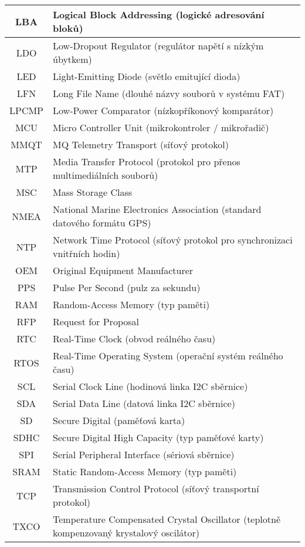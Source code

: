 \begin{longtable}{|c|p{12cm}|}
LBA     & Logical Block Addressing (logické adresování bloků) \\ \hline
LDO     & Low-Dropout Regulator (regulátor napětí s nízkým úbytkem) \\ \hline
LED     & Light-Emitting Diode (světlo emitující dioda) \\ \hline
LFN     & Long File Name (dlouhé názvy souborů v systému FAT) \\ \hline
LPCMP   & Low-Power Comparator (nízkopříkonový komparátor) \\ \hline
MCU     & Micro Controller Unit (mikrokontroler / mikrořadič) \\ \hline
MMQT    & MQ Telemetry Transport (síťový protokol) \\ \hline
MTP     & Media Transfer Protocol (protokol pro přenos multimediálních souborů) \\ \hline
MSC     & Mass Storage Class \\ \hline
NMEA    & National Marine Electronics Association (standard datového formátu GPS) \\ \hline
NTP     & Network Time Protocol (síťový protokol pro synchronizaci vnitřních hodin) \\ \hline
OEM     & Original Equipment Manufacturer \\ \hline
PPS     & Pulse Per Second (pulz za sekundu) \\ \hline
RAM     & Random-Access Memory (typ paměti) \\ \hline
RFP     & Request for Proposal \\ \hline
RTC     & Real-Time Clock (obvod reálného času) \\ \hline
RTOS    & Real-Time Operating System (operační systém reálného času) \\ \hline
SCL     & Serial Clock Line (hodinová linka I2C sběrnice) \\ \hline
SDA     & Serial Data Line (datová linka I2C sběrnice) \\ \hline
SD      & Secure Digital (paměťová karta) \\ \hline
SDHC    & Secure Digital High Capacity (typ paměťové karty) \\ \hline
SPI     & Serial Peripheral Interface (sériová sběrnice) \\ \hline
SRAM    & Static Random-Access Memory (typ paměti) \\ \hline
TCP     & Transmission Control Protocol (síťový transportní protokol) \\ \hline
TXCO    & Temperature Compensated Crystal Oscillator (teplotně kompenzovaný krystalový oscilátor) \\ \hline

\end{longtable}
